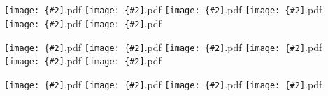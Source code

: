 \documentclass[12pt,a4paper]{article}
\newcommand{\pdffig}[2][0.5]{\texttt{[image: \{\#2]}.pdf}}
\begin{document}
\section{}

\noindent\pdffig[0.5]{aus_ulow_reg}
\pdffig[0.5]{aus_vlow_reg}
\pdffig[0.5]{aus_umid_reg}
\pdffig[0.5]{aus_vmid_reg}
\pdffig[0.5]{aus_uup_reg}
\pdffig[0.5]{aus_vup_reg}

\noindent\pdffig[0.5]{aus_ulow_cor}
\pdffig[0.5]{aus_vlow_cor}
\pdffig[0.5]{aus_umid_cor}
\pdffig[0.5]{aus_vmid_cor}
\pdffig[0.5]{aus_uup_cor}
\pdffig[0.5]{aus_vup_cor}

\noindent\pdffig[0.5]{aus_wlow_reg}
\pdffig[0.5]{aus_wup_reg}
\noindent\pdffig[0.5]{aus_wlow_cor}
\pdffig[0.5]{aus_wup_cor}
\end{document}
